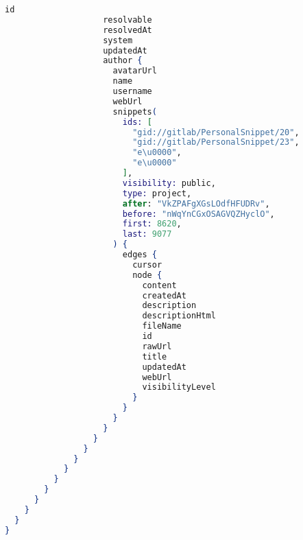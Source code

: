 \begin{lstlisting}[language=elixir]
                    id
                    resolvable
                    resolvedAt
                    system
                    updatedAt
                    author {
                      avatarUrl
                      name
                      username
                      webUrl
                      snippets(
                        ids: [
                          "gid://gitlab/PersonalSnippet/20",
                          "gid://gitlab/PersonalSnippet/23",
                          "e\u0000",
                          "e\u0000"
                        ],
                        visibility: public,
                        type: project,
                        after: "VkZPAFgXGsLOdfHFUDRv",
                        before: "nWqYnCGxOSAGVQZHyclO",
                        first: 8620,
                        last: 9077
                      ) {
                        edges {
                          cursor
                          node {
                            content
                            createdAt
                            description
                            descriptionHtml
                            fileName
                            id
                            rawUrl
                            title
                            updatedAt
                            webUrl
                            visibilityLevel
                          }
                        }
                      }
                    }
                  }
                }
              }
            }
          }
        }
      }
    }
  }
}
\end{lstlisting}